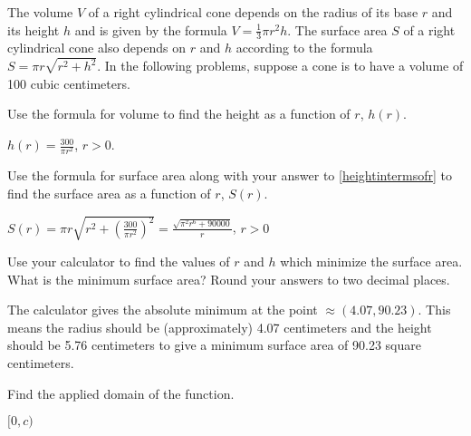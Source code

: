 \documentclass{ximera}
\begin{document}
\begin{question}
The volume $V$ of a right cylindrical cone depends on the radius of its base $r$ and its height $h$ and is given by the formula $V = \frac{1}{3} \pi r^2 h$.  The surface area $S$ of a right cylindrical cone also depends on $r$ and $h$ according to the formula $S = \pi r \sqrt{r^2+h^2}$.  In the following problems, suppose a cone is to have a volume of 100 cubic centimeters. 

\begin{solution}
\end{solution}

\end{question}

\begin{question}
Use the formula for volume to find the height as a function of $r$, $h(r)$.
\begin{solution}
$h(r) = \frac{300}{\pi r^2}$, $r > 0$.
\end{solution}

\end{question}

\begin{question}
Use the formula for surface area along with  your answer to \ref{heightintermsofr} to find the surface area as a function of $r$, $S(r)$.
\begin{solution}
$S(r) = \pi r \sqrt{r^2+\left(\frac{300}{\pi r^2}\right)^2} = \frac{\sqrt{\pi^2 r^6+90000}}{r}$, $r>0$
\end{solution}

\end{question}

\begin{question}
Use your calculator to find the values of $r$ and $h$ which minimize the surface area.  What is the minimum surface area?  Round your answers to two decimal places.
\begin{solution}
The calculator gives the absolute minimum at the point $\approx (4.07, 90.23)$.  This means the radius should be (approximately) 4.07 centimeters and the height should be 5.76 centimeters to give a minimum surface area of 90.23 square centimeters.
\end{solution}

\end{question}

\begin{question}
Find the applied domain of the function.
\begin{solution}
$[0, c)$
\end{solution}

\end{question}
\end{document}
